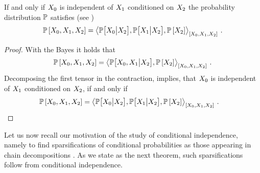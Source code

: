 \begin{corollary}
    \label{cor:secCriterionCondIndepencence}
    If and only if $X_{0}$ is independent of $X_{1}$ conditioned on $X_{2}$ the probability distribution $\mathbb{P}$ satisfies (see )
    \begin{align*}
        \mathbb{P}\left[X_{0},X_{1},X_{2}\right]
        = \left\langle \mathbb{P}\big[X_{0}\big|X_{2}\big],\mathbb{P}\big[X_{1}\big|X_{2}\big],\mathbb{P}\left[X_{2}\right]\right\rangle_{\left[ X_{0},X_{1},X_{2} \right]} \, .
    \end{align*}
\end{corollary}
\begin{proof}
    With the Bayes  it holds that
    \begin{align*}
        \mathbb{P}\left[X_{0},X_{1},X_{2}\right]
        = \left\langle \mathbb{P}\big[X_{0},X_{1}\big|X_{2}\big],\mathbb{P}\left[X_{2}\right]\right\rangle_{\left[ X_{0},X_{1},X_{2} \right]} \, .
    \end{align*}
    Decomposing the first tensor in the contraction,  implies, that $X_{0}$ is independent of $X_{1}$ conditioned on $X_{2}$, if and only if
    \begin{align*}
        \mathbb{P}\left[X_{0},X_{1},X_{2}\right]
        = \left\langle \mathbb{P}\big[X_{0}\big|X_{2}\big],\mathbb{P}\big[X_{1}\big|X_{2}\big],\mathbb{P}\left[X_{2}\right]\right\rangle_{\left[ X_{0},X_{1},X_{2} \right]} \, . & \qedhere
    \end{align*}
\end{proof}


Let us now recall our motivation of the study of conditional independence, namely to find sparsifications of conditional probabilities as those appearing in chain decompositions .
As we state as the next theorem, such sparsifications follow from conditional independence.


